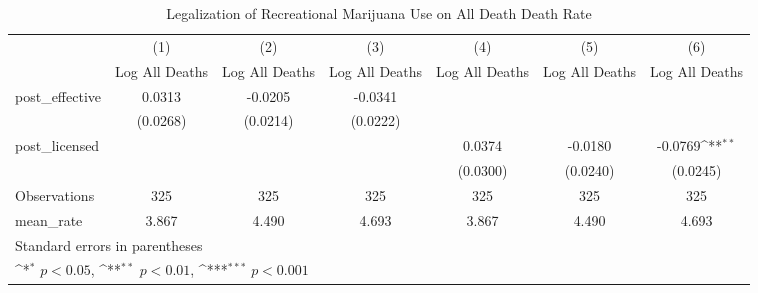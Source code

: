 \begin{table}[htbp]\centering
\def\sym#1{\ifmmode^{#1}\else\(^{#1}\)\fi}
\caption{Legalization of Recreational Marijuana Use on All Death Death Rate}
\begin{tabular}{l*{6}{c}}
\hline\hline
                    &\multicolumn{1}{c}{(1)}&\multicolumn{1}{c}{(2)}&\multicolumn{1}{c}{(3)}&\multicolumn{1}{c}{(4)}&\multicolumn{1}{c}{(5)}&\multicolumn{1}{c}{(6)}\\
                    &\multicolumn{1}{c}{Log All Deaths}&\multicolumn{1}{c}{Log All Deaths}&\multicolumn{1}{c}{Log All Deaths}&\multicolumn{1}{c}{Log All Deaths}&\multicolumn{1}{c}{Log All Deaths}&\multicolumn{1}{c}{Log All Deaths}\\
\hline
post\_effective      &      0.0313         &     -0.0205         &     -0.0341         &                     &                     &                     \\
                    &    (0.0268)         &    (0.0214)         &    (0.0222)         &                     &                     &                     \\
[1em]
post\_licensed       &                     &                     &                     &      0.0374         &     -0.0180         &     -0.0769\sym{**} \\
                    &                     &                     &                     &    (0.0300)         &    (0.0240)         &    (0.0245)         \\
\hline
Observations        &         325         &         325         &         325         &         325         &         325         &         325         \\
mean\_rate           &       3.867         &       4.490         &       4.693         &       3.867         &       4.490         &       4.693         \\
\hline\hline
\multicolumn{7}{l}{\footnotesize Standard errors in parentheses}\\
\multicolumn{7}{l}{\footnotesize \sym{*} \(p<0.05\), \sym{**} \(p<0.01\), \sym{***} \(p<0.001\)}\\
\end{tabular}
\end{table}
